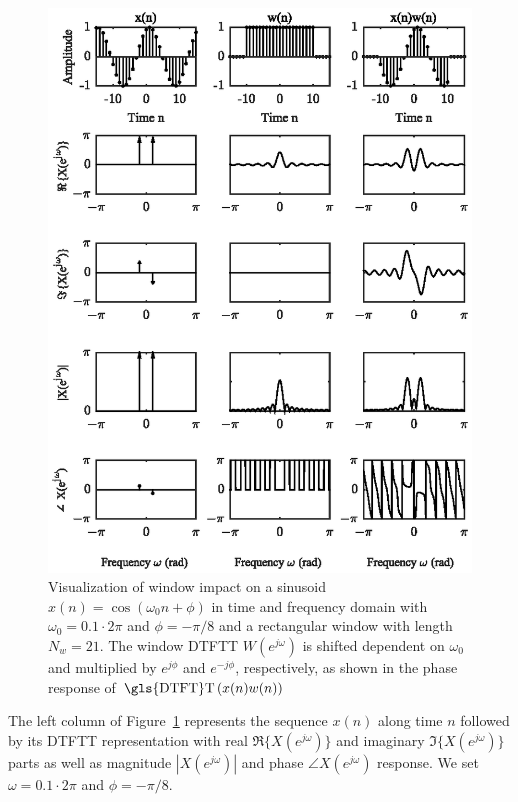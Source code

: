 \begin{figure}
	\center %
	\includegraphics{figures/figure3_1.eps}
	\vspace{-0.6cm}
	\caption{Visualization of window impact on a sinusoid $x(n)=\cos(\omega_0 n+\phi)$ in time and frequency domain with $\omega_0=0.1\cdot2\pi$ and $\phi=-\pi/8$ and a rectangular window with length $N_w=21$. The window \gls{DTFT}T $W(e^{j\omega})$ is shifted dependent on $\omega_0$ and multiplied by $e^{j\phi}$ and $e^{-j\phi}$, respectively, as shown in the phase response of $\text{\gls{DTFT}T}\left(x(n)w(n)\right)$}\label{Figure31}
\end{figure}

\noindent The left column of Figure~\ref{Figure31} represents the sequence $x(n)$ along time $n$ followed by its \gls{DTFT}T representation with real $\Re\{X(e^{j\omega})\}$ and imaginary $\Im\{X(e^{j\omega})\}$ parts as well as magnitude $|X(e^{j\omega})|$ and phase $\angle X(e^{j\omega})$ response. We set $\omega=0.1\cdot2\pi$ and $\phi=-\pi/8$.\\

